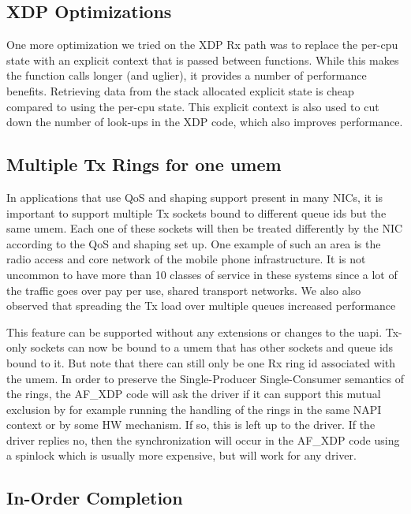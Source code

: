 \documentclass[9pt,numbers,reprint]{sigplanconf}
\begin{document}
\subsection{XDP Optimizations}

One more optimization we tried on the XDP Rx path was to replace the
per-cpu state with an explicit context that is passed between
functions. While this makes the function calls longer (and uglier), it
provides a number of performance benefits. Retrieving data from the
stack allocated explicit state is cheap compared to using the per-cpu
state. This explicit context is also used to cut down the number of
look-ups in the XDP code, which also improves performance.


\subsection{Multiple Tx Rings for one umem}

In applications that use QoS and shaping support present in many NICs,
it is important to support multiple Tx sockets bound to different
queue ids but the same umem. Each one of these sockets will then be
treated differently by the NIC according to the QoS and shaping set
up. One example of such an area is the radio access and core network
of the mobile phone infrastructure. It is not uncommon to have more
than 10 classes of service in these systems since a lot of the traffic
goes over pay per use, shared transport networks. We also also
observed that spreading the Tx load over multiple queues increased
performance

This feature can be supported without any extensions or changes to the
uapi. Tx-only sockets can now be bound to a umem that has other
sockets and queue ids bound to it. But note that there can still only
be one Rx ring id associated with the umem. In order to preserve the
Single-Producer Single-Consumer semantics of the rings, the AF\_XDP
code will ask the driver if it can support this mutual exclusion by
for example running the handling of the rings in the same NAPI
context or by some HW mechanism. If so, this is left up to the
driver. If the driver replies no, then the synchronization will occur
in the AF\_XDP code using a spinlock which is usually more expensive,
but will work for any driver.


\subsection{In-Order Completion}
\end{document}

